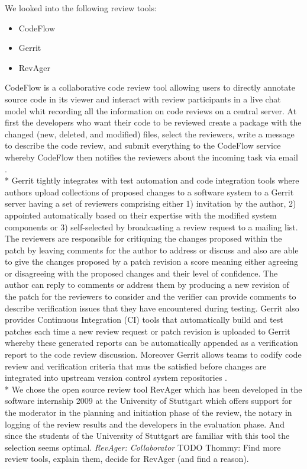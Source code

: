 We looked into the following review tools:
\begin{itemize}
	\item CodeFlow
	\item Gerrit
	\item RevAger
\end{itemize}
CodeFlow is a collaborative code review tool allowing users to directly annotate source code in its viewer and interact with review participants in a live chat model whit recording all the information on code reviews on a central server. At first the developers who want their code to be reviewed create a package with the changed (new, deleted, and modified) files, select the reviewers, write a message to describe the code review, and submit everything to the CodeFlow service whereby CodeFlow then notifies the reviewers about the incoming task via email \cite{Bacchelli:2013:EOC:2486788.2486882}. \\*
Gerrit tightly integrates with test automation and code integration tools where authors upload collections of proposed changes to a software system to a Gerrit server having a set of reviewers comprising either 1) invitation by the author, 2) appointed automatically based on their expertise with the modified system components or 3) self-selected by broadcasting a review request to a mailing list. The reviewers are responsible for critiquing the changes proposed within the patch by leaving comments for the author to address or discuss and also are able to give the changes proposed by a patch revision a score meaning either agreeing or disagreeing with the proposed changes and their level of confidence. The author can reply to comments or address them by producing a new revision of the patch for the reviewers to consider and the verifier can provide comments to describe verification issues that they have encountered during testing. Gerrit also provides Continuous Integration (CI) tools that automatically build and test patches each time a new review request or patch revision is uploaded to Gerrit whereby these generated reports can be automatically appended as a verification report to the code review discussion. Moreover Gerrit allows teams to codify code review and verification criteria that mus tbe satisfied before changes are integrated into upstream version control system repositories \cite{McIntosh:2014:ICR:2597073.2597076}. \\*
We chose the open source review tool RevAger which has been developed in the software internship 2009 at the University of Stuttgart which offers support for the moderator in the planning and initiation phase of the review, the notary in logging of the review results and the developers in the evaluation phase. And since the students of the University of Stuttgart are familiar with this tool the selection seems optimal.
\textit{RevAger:}
\textit{Collaborator}
TODO Thommy: Find more review tools, explain them, decide for RevAger (and find a reason).

